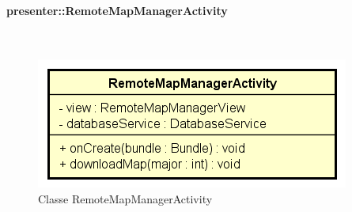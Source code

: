 \documentclass[../DefinizioneDiProdotto.tex]{subfiles}
\begin{document}
\paragraph{presenter::RemoteMapManagerActivity}
\
\begin{figure}[H]
	\centering
	\includegraphics[width=\maxwidth]{img/RemoteMapManagerActivity.png}
	\caption{Classe RemoteMapManagerActivity}\label{fig:presenter::RemoteMapManagerActivity} 
\end{figure}
\end{document}
